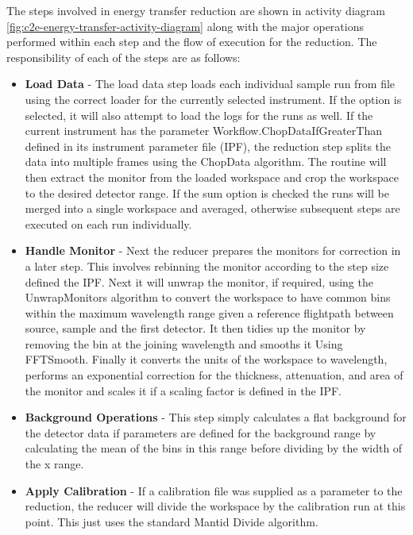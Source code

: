 \documentclass[paper=a4, fontsize=11pt]{scrartcl}	%
\numberwithin{equation}{section}															%
\numberwithin{figure}{section}																%
\numberwithin{table}{section}																%
\begin{document}
The steps involved in energy transfer reduction are shown in activity diagram \ref{fig:c2e-energy-transfer-activity-diagram} along with the major operations performed within each step and the flow of execution for the reduction. The responsibility of each of the steps are as follows:

\begin{itemize}
\item \textbf{Load Data} - The load data step loads each individual sample run from file using the correct loader for the currently selected instrument. If the option is selected, it will also attempt to load the logs for the runs as well. If the current instrument has the parameter Workflow.ChopDataIfGreaterThan defined  in its instrument parameter file (IPF), the reduction step splits the data into multiple frames using the ChopData algorithm. The routine will then extract the monitor from the loaded workspace and crop the workspace to the desired detector range. If the sum option is checked the runs will be merged into a single workspace and averaged, otherwise subsequent steps are executed on each run individually.

\item \textbf{Handle Monitor} - Next the reducer prepares the monitors for correction in a later step. This involves rebinning the monitor according to the step size defined the IPF. Next it will unwrap the monitor, if required, using the UnwrapMonitors algorithm to convert the workspace to have common bins within the maximum wavelength range given a reference flightpath between source, sample and the first detector. It then tidies up the monitor by removing the bin at the joining wavelength and smooths it Using FFTSmooth. Finally it converts the units of the workspace to wavelength, performs an exponential correction for the thickness, attenuation, and area of the monitor and scales it if a scaling factor is defined in the IPF.

\item \textbf{Background Operations} - This step simply calculates a flat background for the detector data if parameters are defined for the background range by calculating the mean of the bins in this range before dividing by the width of the x range.

\item \textbf{Apply Calibration} - If a calibration file was supplied as a parameter to the reduction, the reducer will divide the workspace by the calibration run at this point. This just uses the standard Mantid Divide algorithm.


\end{itemize}
\end{document}
